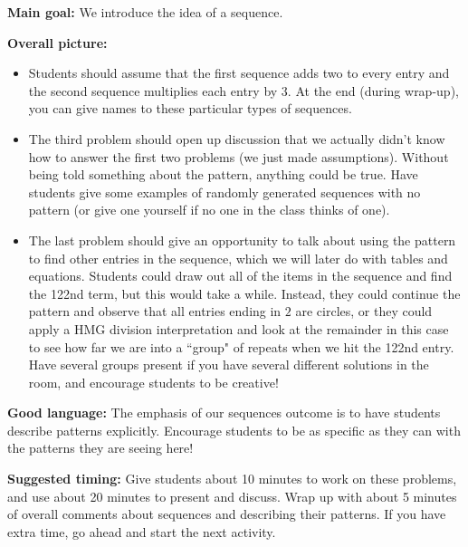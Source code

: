 \documentclass{ximera}
\begin{document}
\begin{instructorNotes}

{\bf Main goal:} We introduce the idea of a sequence.

{\bf Overall picture:} 

\begin{itemize}
	\item Students should assume that the first sequence adds two to every entry and the second sequence multiplies each entry by $3$. At the end (during wrap-up), you can give names to these particular types of sequences.
	\item The third problem should open up discussion that we actually didn't know how to answer the first two problems (we just made assumptions). Without being told something about the pattern, anything could be true. Have students give some examples of randomly generated sequences with no pattern (or give one yourself if no one in the class thinks of one).
	\item The last problem should give an opportunity to talk about using the pattern to find other entries in the sequence, which we will later do with tables and equations. Students could draw out all of the items in the sequence and find the 122nd term, but this would take a while. Instead, they could continue the pattern and observe that all entries ending in $2$ are circles, or they could apply a HMG division interpretation and look at the remainder in this case to see how far we are into a ``group" of repeats when we hit the 122nd entry. Have several groups present if you have several different solutions in the room, and encourage students to be creative!
\end{itemize}



{\bf Good language:} The emphasis of our sequences outcome is to have students describe patterns explicitly. Encourage students to be as specific as they can with the patterns they are seeing here!

{\bf Suggested timing:} Give students about 10 minutes to work on these problems, and use about 20 minutes to present and discuss. Wrap up with about 5 minutes of overall comments about sequences and describing their patterns. If you have extra time, go ahead and start the next activity.


\end{instructorNotes}
\end{document}
